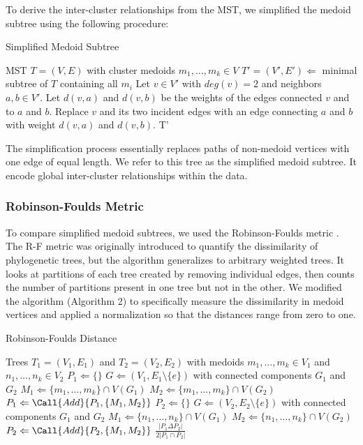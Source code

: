 \documentclass{article}
\begin{document}
To derive the inter-cluster relationships from the MST, we simplified the medoid subtree using the following procedure:

\begin{algorithm}[H]
\caption{Simplified Medoid Subtree}\label{algo1}
\begin{algorithmic}[1]
\Require MST $T = (V, E)$ with cluster medoids $m_1, \hdots, m_k \in V$
\State $T' = (V', E') \Leftarrow$ minimal subtree of $T$ containing all $m_i$
\Repeat
	\State Let $v \in V'$ with $deg(v) = 2$ and neighbors $a, b \in V'$. Let $d(v, a)$ and $d(v, b)$ be the weights of the edges connected $v$ and to $a$ and $b$.
	\State Replace $v$ and its two incident edges with an edge connecting $a$ and $b$ with weight $d(v, a)$ and $d(v, b)$.
\State \Output T'
\end{algorithmic}
\end{algorithm}

The simplification process essentially replaces paths of non-medoid vertices with one edge of equal length. We refer to this tree as the simplified medoid subtree. It encode global inter-cluster relationships within the data.

\subsubsection{Robinson-Foulds Metric}
To compare simplified medoid subtrees, we used the Robinson-Foulds metric \cite{RF metric}. The R-F metric was originally introduced to quantify the dissimilarity of phylogenetic trees, but the algorithm generalizes to arbitrary weighted trees. It looks at partitions of each tree created by removing individual edges, then counts the number of partitions present in one tree but not in the other. We modified the algorithm (Algorithm 2) to specifically measure the dissimilarity in medoid vertices and applied a normalization so that the distances range from zero to one.

\begin{algorithm}[H]
\caption{Robinson-Foulds Distance}\label{algo2}
\begin{algorithmic}[2]
\Require Trees $T_1 = (V_1,E_1)$ and $T_2 = (V_2, E_2)$ with medoids $m_1, \hdots, m_k \in V_1$ and $n_1, \hdots, n_k \in V_2$
\State $P_1 \Leftarrow \{\}$
	\State $G \Leftarrow (V_1, E_1 \setminus \{e\})$ with connected components $G_1$ and $G_2$
	\State $M_1 \Leftarrow \{m_1,\hdots,m_k\} \cap V(G_1)$
	\State $M_2 \Leftarrow \{m_1,\hdots,m_k\} \cap V(G_2)$
	\State $P_1 \Leftarrow \Call{Add}{P_1, \{M_1, M_2\}}$
\EndFor
\State $P_2 \Leftarrow \{\}$
	\State $G \Leftarrow (V_2, E_2 \setminus \{e\})$ with connected components $G_1$ and $G_2$
	\State $M_1 \Leftarrow \{n_1,\hdots,n_k\} \cap V(G_1)$
	\State $M_2 \Leftarrow \{n_1,\hdots,n_k\} \cap V(G_2)$
	\State $P_2 \Leftarrow \Call{Add}{P_2, \{M_1, M_2\}}$
\EndFor
\State \Output $\frac{\left|P_1 \Delta P_2 \right|}{2\left| P_1 \cap P_2 \right|}$
\end{algorithmic}
\end{algorithm}
\end{document}
